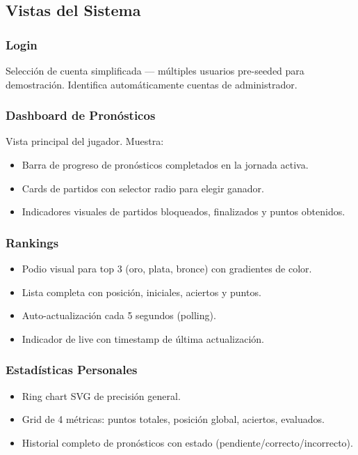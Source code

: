\documentclass[12pt,a4paper]{article}
\begin{document}
\subsection{Vistas del Sistema}

\subsubsection{Login}
Selección de cuenta simplificada — múltiples usuarios pre-seeded para demostración.
Identifica automáticamente cuentas de administrador.

\subsubsection{Dashboard de Pronósticos}
Vista principal del jugador. Muestra:
\begin{itemize}
  \item Barra de progreso de pronósticos completados en la jornada activa.
  \item Cards de partidos con selector radio para elegir ganador.
  \item Indicadores visuales de partidos bloqueados, finalizados y puntos obtenidos.
\end{itemize}

\subsubsection{Rankings}
\begin{itemize}
  \item Podio visual para top 3 (oro, plata, bronce) con gradientes de color.
  \item Lista completa con posición, iniciales, aciertos y puntos.
  \item Auto-actualización cada 5 segundos (polling).
  \item Indicador de live con timestamp de última actualización.
\end{itemize}

\subsubsection{Estadísticas Personales}
\begin{itemize}
  \item Ring chart SVG de precisión general.
  \item Grid de 4 métricas: puntos totales, posición global, aciertos, evaluados.
  \item Historial completo de pronósticos con estado (pendiente/correcto/incorrecto).
\end{itemize}
\end{document}
